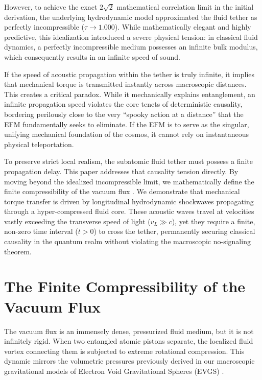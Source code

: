 \documentclass[11pt, a4paper]{article}
\begin{document}
  However, to achieve the exact $2\sqrt{2}$ mathematical correlation limit in the initial derivation, the underlying hydrodynamic model approximated the fluid tether as perfectly incompressible ($\tau \to 1.000$). While mathematically elegant and highly predictive, this idealization introduced a severe physical tension: in classical fluid dynamics, a perfectly incompressible medium possesses an infinite bulk modulus, which consequently results in an infinite speed of sound. 
  
  \clearpage
  If the speed of acoustic propagation within the tether is truly infinite, it implies that mechanical torque is transmitted instantly across macroscopic distances. This creates a critical paradox. While it mechanically explains entanglement, an infinite propagation speed violates the core tenets of deterministic causality, bordering perilously close to the very ``spooky action at a distance'' \cite{epr1935} that the EFM fundamentally seeks to eliminate. If the EFM is to serve as the singular, unifying mechanical foundation of the cosmos, it cannot rely on instantaneous physical teleportation. 
  
  To preserve strict local realism, the subatomic fluid tether must possess a finite propagation delay. This paper addresses that causality tension directly. By moving beyond the idealized incompressible limit, we mathematically define the finite compressibility of the vacuum flux \cite{marabut2026m6}. We demonstrate that mechanical torque transfer is driven by longitudinal hydrodynamic shockwaves propagating through a hyper-compressed fluid core. These acoustic waves travel at velocities vastly exceeding the transverse speed of light ($v_L \gg c$), yet they require a finite, non-zero time interval ($t > 0$) to cross the tether, permanently securing classical causality in the quantum realm without violating the macroscopic no-signaling theorem.

\section{The Finite Compressibility of the Vacuum Flux}
  The vacuum flux is an immensely dense, pressurized fluid medium, but it is not infinitely rigid. When two entangled atomic pistons separate, the localized fluid vortex connecting them is subjected to extreme rotational compression. This dynamic mirrors the volumetric pressures previously derived in our macroscopic gravitational models of Electron Void Gravitational Spheres (EVGS) \cite{marabut2026m8, marabut2026m10}. 
  
\end{document}
